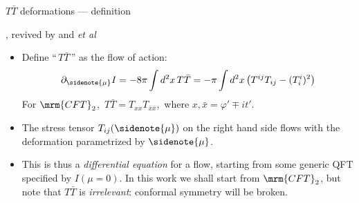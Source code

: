 \documentclass[
	10pt
	,noamsthm
]{beamer}
\newcommand{\TTbar}{\texorpdfstring{\ensuremath{T\bar{T}}}{TTbar}\xspace}
\begin{document}
\newcommand{\citeTTbar}{%
	\textcite{Zamolodchikov:2004ce}, revived by \textcite{Smirnov:2016lqw} and \textcite{Cavaglia:2016oda} \textit{et al}
}


\begin{frame}{\TTbar deformations --- definition}{%
	\citeTTbar
}
\begin{itemize}

\item Define ``\,\TTbar\,'' as the flow of action:
\begin{equation}
	\partial_{\sidenote{\mu}} I = -{8 \pi} \int d^2x \, T\bar T =  -{\pi} \int d^2x\,\big( T^{ij}T_{ij}- (T^i_i)^2 \big)
	\label{TTbardef}
\end{equation}
For $\mrm{CFT}_2$,\ $T\bar{T} = T_{xx} T_{\bar{x}\bar{x}}$,\ where $x, \bar{x} = \varphi' \mp it'$.

\item The stress tensor $T_{ij}(\sidenote{\mu})$ on the right hand side flows with the deformation parametrized by $\sidenote{\mu}$. 

\pause

\item This is thus a \textit{differential equation} for a flow, starting from some generic QFT specified by $I(\mu = 0)$. In this work we shall start from $\mrm{CFT}_2$, but note that \TTbar is \textit{irrelevant}: conformal symmetry will be broken.

\end{itemize}
\end{frame}
\end{document}
